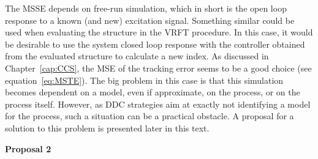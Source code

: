 The MSSE depends on free-run simulation, which in short is the open loop response to a known (and new) excitation signal. Something similar could be used when evaluating the structure in the VRFT procedure. In this case, it would be desirable to use the system closed loop response with the controller obtained from the evaluated structure to calculate a new index. As discussed in Chapter~\ref{cap:CCS}, the MSE of the tracking error seems to be a good choice (see equation~\ref{eq:MSTE}). The big problem in this case is that this simulation becomes dependent on a model, even if approximate, on the process, or on the process itself. However, as DDC strategies aim at exactly not identifying a model for the process, such a situation can be a practical obstacle. A proposal for a solution to this problem is presented later in this text.

\medskip
\textbf{Proposal 2} 

